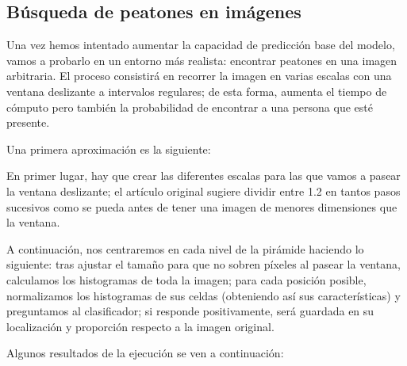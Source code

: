 \documentclass[11pt,a4paper]{article}
\begin{document}
        \subsection{Búsqueda de peatones en imágenes}

            \par
            Una vez hemos intentado aumentar la capacidad de predicción base del modelo, vamos a probarlo en un entorno más realista: encontrar peatones en una imagen arbitraria. El proceso consistirá en recorrer la imagen en varias escalas con una ventana deslizante a intervalos regulares; de esta forma, aumenta el tiempo de cómputo pero también la probabilidad de encontrar a una persona que esté presente.

            \par
            Una primera aproximación es la siguiente:


            \par
            En primer lugar, hay que crear las diferentes escalas para las que vamos a pasear la ventana deslizante; el artículo original sugiere dividir entre 1.2 en tantos pasos sucesivos como se pueda antes de tener una imagen de menores dimensiones que la ventana.

            \par
            A continuación, nos centraremos en cada nivel de la pirámide haciendo lo siguiente: tras ajustar el tamaño para que no sobren píxeles al pasear la ventana, calculamos los histogramas de toda la imagen; para cada posición posible, normalizamos los histogramas de sus celdas (obteniendo así sus características) y preguntamos al clasificador; si responde positivamente, será guardada en su localización y proporción respecto a la imagen original.

            \par
            Algunos resultados de la ejecución se ven a continuación:

            \vspace{0.3cm}
\end{document}
